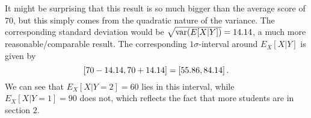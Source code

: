 \begin{ex}
It might be surprising that this result is so much bigger than the average score of $70$, but this simply comes from the quadratic nature of the variance. The corresponding standard deviation would be $\sqrt{\operatorname{var}(E[X | Y])} = 14.14$, a much more reasonable/comparable result. %
The corresponding $1\sigma$-interval around $E_X[X | Y]$ is given by
\begin{equation*}
\qty[70 - 14.14, 70 + 14.14] = \qty[55.86, 84.14] \, .
\end{equation*}
We can see that $E_X[X | Y = 2] = 60$ lies in this interval, while $E_X[X | Y = 1] = 90$ does not, which reflects the fact that more students are in section $2$.


\end{ex}



